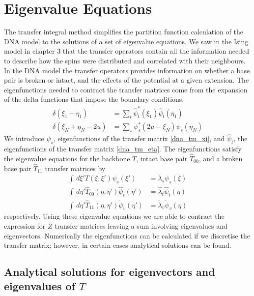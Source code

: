 \section{Eigenvalue Equations}
%
The transfer integral method simplifies the partition function calculation of the DNA model to the solutions of a set of eigenvalue equations. We saw in the Ising model in chapter 3 that the transfer operators contain all the information needed to describe how the spins were distributed and correlated with their neighbours. In the DNA model the transfer operators provides information on whether a base pair is broken or intact, and the effects of the potential at a given extension. The eigenfunctions needed to contract the transfer matrices come from the expansion of the delta functions that impose the boundary conditions. 
%
\begin{align}
\label{dna_delta_1}\delta\left(\xi_{1}-\eta_{1}\right)&=\sum_{t}\hat{\psi}^{*}_{t}\left(\xi_{1}\right)\hat{\psi}_{t}\left(\eta_{1}\right)\\
\label{dna_delta_2}\delta\left(\xi_{N}+\eta_{N}-2u\right)&=\sum_{s}\psi^{*}_{s}\left(2u-\xi_{N}\right)\psi_{s}\left(\eta_{N}\right)
\end{align}
%
We introduce $\psi_{s}$, eigenfunctions of the transfer matrix \eqref{dna_tm_xi}, and $\hat{\psi}_{t}$, the eigenfunctions of the transfer matrix \eqref{dna_tm_eta}. The eigenfunctions satisfy the eigenvalue equations for the backbone $T$, intact base pair $\hat{T}_{00}$, and a broken base pair $\hat{T}_{11}$ transfer matrices by
%
\begin{align}
\label{dna_eign_t}
\int \,d\xi'T\left(\xi,\xi'\right)\psi_{s}\left(\xi'\right) &= \lambda_{s}\psi_{s}\left(\xi\right) \\
\label{dna_eign_hat}
\int \,d\eta'\hat{T}_{00}\left(\eta,\eta'\right)\hat{\psi}_{t}\left(\eta'\right) &= \hat{\lambda}_{t}\hat{\psi}_{t}\left(\eta\right) \\
\label{dna_eign_twidle}
\int \,d\eta'\hat{T}_{11}\left(\eta,\eta'\right)\tilde{\psi}_{v}\left(\eta'\right) &=\tilde{ \lambda}_{v}\tilde{\psi}_{v}\left(\eta\right)
\end{align}
%
respectively. Using these eigenvalue equations we are able to contract the expression for $Z$ transfer matrices leaving a sum involving eigenvalues and eigenvectors. Numerically the eigenfunctions can be calculated if we discretise the transfer matrix; however, in certain cases analytical solutions can be found. 
%
\subsection{Analytical solutions for eigenvectors and eigenvalues of $T$}

